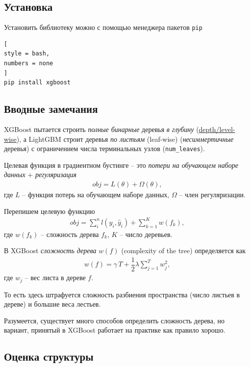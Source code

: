 \documentclass[%
	11pt,
	a4paper,
	utf8,
		]{article}
\begin{document}
\subsection{Установка}

Установить библиотеку можно с помощью менеджера пакетов \verb|pip|
\begin{lstlisting}[
style = bash,
numbers = none	
]
pip install xgboost
\end{lstlisting}

\subsection{Вводные замечания}

XGBoost пытается строить \emph{полные бинарные} деревья \emph{в глубину} (\href{https://lightgbm.readthedocs.io/en/latest/Experiments.html}{depth/level-wise}), а LightGBM строит деревья \emph{по листьям} (leaf-wise) (\emph{несиммертичные} деревья) с ограничением числа терминальных узлов (\verb|num_leaves|).

Целевая функция в градиентном бустинге -- это \emph{потери на обучающем наборе данных} + \emph{регуляризация}
\begin{align*}
	obj  = L(\theta) + \Omega (\theta),
\end{align*}
где $ L $ -- функция потерь на обучающем наборе данных, $ \Omega $ -- член регуляризации.

Перепишем целевую функцию
\begin{align*}
	obj = \sum_i^n l(y_i, \hat{y}_i) +\sum_{k=1}^K w(f_k),
\end{align*}
где $ w(f_k) $ -- сложность дерева $ f_k $, $ K $ -- число деревьев.

В XGBoost \emph{сложность дерева} $ w(f) $ (complexity of the tree) определяется как
\begin{align*}
	w(f) = \gamma \, T + \dfrac{1}{2} \lambda \sum_{j=1}^{T} w_j^2,
\end{align*}
где $ w_j $ -- вес листа в дереве $ f $.

То есть здесь штрафуется сложность разбиения пространства (число листьев в дереве) и большие веса лестьев.

Разумеется, существует много способов определить сложность дерева, но вариант, принятый в XGBoost работает на практике как правило хорошо.

\subsection{Оценка структуры}
\end{document}
